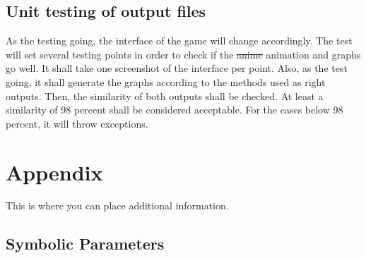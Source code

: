 \documentclass[12pt, titlepage]{article}
\begin{document}
\subsection{Unit testing of output files}		
\tab  As the testing going, the interface of the game will change accordingly. The test will set several testing points in order to check if the  \st{anime} {\color{red} animation}  and graphs go well. It shall take one screenshot of the interface per point. Also, as the test going, it shall generate the graphs according to the methods used as right outputs. Then, the similarity of both outputs shall be checked. At least a similarity of 98 percent shall be considered acceptable. For the cases below 98 percent, it will throw exceptions.





\newpage

\section{Appendix}

This is where you can place additional information.

\subsection{Symbolic Parameters}
\end{document}
